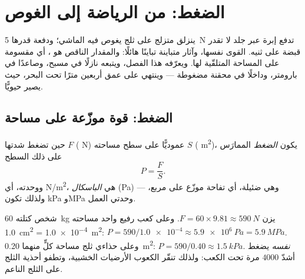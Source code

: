 \chapter{الضغط: من الرياضة إلى الغوص}\label{ch:g10:pressure}

ينزلق متزلج على ثلج يغوص فيه الماشي؛ ودفعة قدرها \qty{5}{N}
تدفع إبرة عبر جلد لا تقدر قبضة على ثنيه. القوى نفسها،
وآثار متباينة تباينًا هائلًا: والمقدار الناقص هو \emph{}،
أي  مقسومة على المساحة المتلقّية لها. ويعرّفه هذا الفصل،
ويتبعه نازلًا في مسبح، وصاعدًا في بارومتر، وداخلًا في محقنة مضغوطة ---
وينتهي على عمق أربعين مترًا تحت البحر، حيث يصير حيويًّا.

\section{الضغط: قوة موزّعة على مساحة}

\begin{definition}[الضغط]\label{def:g10:pressure:pressure}
حين تضغط  شدتها $F$ ( \unit{N}) عموديًّا على
سطح مساحته $S$ ( \unit{m^2})، يكون \emph{الضغط}
الممارَس على ذلك السطح
\[
P = \frac{F}{S}.
\]
ووحدته، أي \unit{N/m^2}، هي \emph{الباسكال}
(\unit{Pa}) --- وهي  ضئيلة، أي  تفاحة موزّع على 
مربع، ولذلك تكون \unit{kPa} و\unit{MPa} وحدتي العمل.
\end{definition}

\begin{example}\label{ex:g10:pressure:snowshoe}
شخص كتلته \qty{60}{kg} يزن $F = 60 \times 9.81 \approx \qty{590}{N}$.
وعلى كعب رفيع واحد مساحته \qty{1.0}{cm^2} = \qty{1.0e-4}{m^2}:
$P = 590/\num{1.0e-4} \approx \qty{5.9e6}{Pa} = \qty{5.9}{MPa}$. وعلى حذاءي
ثلج مساحة كلٍّ منهما \qty{0.20}{m^2}:
$P = 590/0.40 \approx \qty{1.5}{kPa}$.  \emph{نفسه} يضغط
أشدّ $4000$ مرة تحت الكعب: ولذلك تنقّر الكعوب الأرضيات الخشبية،
وتطفو أحذية الثلج على الثلج الناعم.
\end{example}

